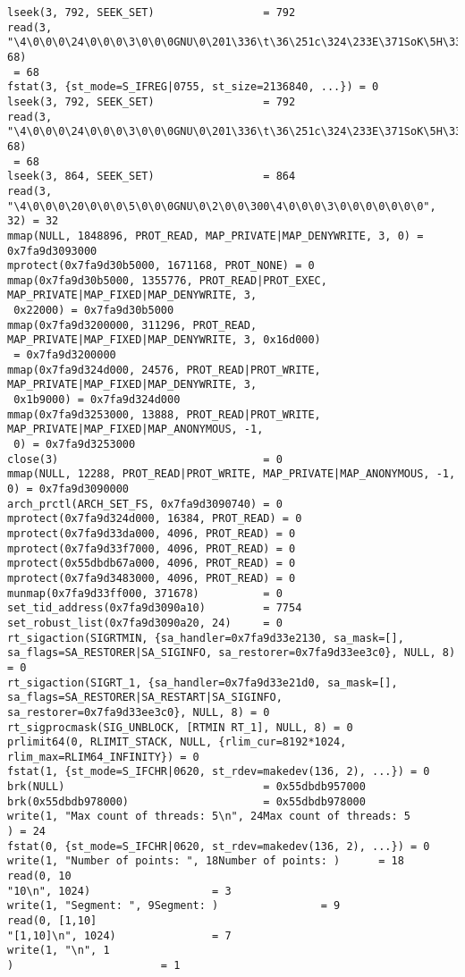\documentclass[12pt]{article}
\begin{document}
{\begin{lstlisting}[escapechar=!]
lseek(3, 792, SEEK_SET)                 = 792
read(3, "\4\0\0\0\24\0\0\0\3\0\0\0GNU\0\201\336\t\36\251c\324\233E\371SoK\5H\334"..., 68)
 = 68
fstat(3, {st_mode=S_IFREG|0755, st_size=2136840, ...}) = 0
lseek(3, 792, SEEK_SET)                 = 792
read(3, "\4\0\0\0\24\0\0\0\3\0\0\0GNU\0\201\336\t\36\251c\324\233E\371SoK\5H\334"..., 68)
 = 68
lseek(3, 864, SEEK_SET)                 = 864
read(3, "\4\0\0\0\20\0\0\0\5\0\0\0GNU\0\2\0\0\300\4\0\0\0\3\0\0\0\0\0\0\0", 32) = 32
mmap(NULL, 1848896, PROT_READ, MAP_PRIVATE|MAP_DENYWRITE, 3, 0) = 0x7fa9d3093000
mprotect(0x7fa9d30b5000, 1671168, PROT_NONE) = 0
mmap(0x7fa9d30b5000, 1355776, PROT_READ|PROT_EXEC, MAP_PRIVATE|MAP_FIXED|MAP_DENYWRITE, 3,
 0x22000) = 0x7fa9d30b5000
mmap(0x7fa9d3200000, 311296, PROT_READ, MAP_PRIVATE|MAP_FIXED|MAP_DENYWRITE, 3, 0x16d000)
 = 0x7fa9d3200000
mmap(0x7fa9d324d000, 24576, PROT_READ|PROT_WRITE, MAP_PRIVATE|MAP_FIXED|MAP_DENYWRITE, 3,
 0x1b9000) = 0x7fa9d324d000
mmap(0x7fa9d3253000, 13888, PROT_READ|PROT_WRITE, MAP_PRIVATE|MAP_FIXED|MAP_ANONYMOUS, -1,
 0) = 0x7fa9d3253000
close(3)                                = 0
mmap(NULL, 12288, PROT_READ|PROT_WRITE, MAP_PRIVATE|MAP_ANONYMOUS, -1, 0) = 0x7fa9d3090000
arch_prctl(ARCH_SET_FS, 0x7fa9d3090740) = 0
mprotect(0x7fa9d324d000, 16384, PROT_READ) = 0
mprotect(0x7fa9d33da000, 4096, PROT_READ) = 0
mprotect(0x7fa9d33f7000, 4096, PROT_READ) = 0
mprotect(0x55dbdb67a000, 4096, PROT_READ) = 0
mprotect(0x7fa9d3483000, 4096, PROT_READ) = 0
munmap(0x7fa9d33ff000, 371678)          = 0
set_tid_address(0x7fa9d3090a10)         = 7754
set_robust_list(0x7fa9d3090a20, 24)     = 0
rt_sigaction(SIGRTMIN, {sa_handler=0x7fa9d33e2130, sa_mask=[],
sa_flags=SA_RESTORER|SA_SIGINFO, sa_restorer=0x7fa9d33ee3c0}, NULL, 8) = 0
rt_sigaction(SIGRT_1, {sa_handler=0x7fa9d33e21d0, sa_mask=[],
sa_flags=SA_RESTORER|SA_RESTART|SA_SIGINFO, sa_restorer=0x7fa9d33ee3c0}, NULL, 8) = 0
rt_sigprocmask(SIG_UNBLOCK, [RTMIN RT_1], NULL, 8) = 0
prlimit64(0, RLIMIT_STACK, NULL, {rlim_cur=8192*1024, rlim_max=RLIM64_INFINITY}) = 0
fstat(1, {st_mode=S_IFCHR|0620, st_rdev=makedev(136, 2), ...}) = 0
brk(NULL)                               = 0x55dbdb957000
brk(0x55dbdb978000)                     = 0x55dbdb978000
write(1, "Max count of threads: 5\n", 24Max count of threads: 5
) = 24
fstat(0, {st_mode=S_IFCHR|0620, st_rdev=makedev(136, 2), ...}) = 0
write(1, "Number of points: ", 18Number of points: )      = 18
read(0, 10
"10\n", 1024)                   = 3
write(1, "Segment: ", 9Segment: )                = 9
read(0, [1,10]
"[1,10]\n", 1024)               = 7
write(1, "\n", 1
)                       = 1

\end{lstlisting}}
\end{document}
